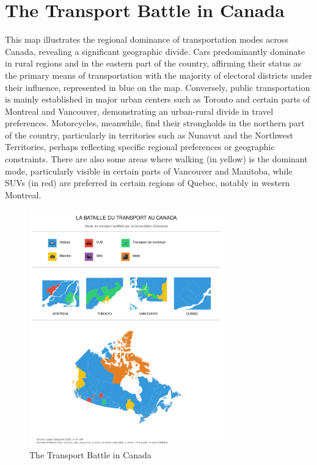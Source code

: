\documentclass[
  letterpaper,
  DIV=11,
  numbers=noendperiod]{scrartcl}
\begin{document}
\section{The Transport Battle in
Canada}\label{the-transport-battle-in-canada}

This map illustrates the regional dominance of transportation modes
across Canada, revealing a significant geographic divide. Cars
predominantly dominate in rural regions and in the eastern part of the
country, affirming their status as the primary means of transportation
with the majority of electoral districts under their influence,
represented in blue on the map. Conversely, public transportation is
mainly established in major urban centers such as Toronto and certain
parts of Montreal and Vancouver, demonstrating an urban-rural divide in
travel preferences. Motorcycles, meanwhile, find their strongholds in
the northern part of the country, particularly in territories such as
Nunavut and the Northwest Territories, perhaps reflecting specific
regional preferences or geographic constraints. There are also some
areas where walking (in yellow) is the dominant mode, particularly
visible in certain parts of Vancouver and Manitoba, while SUVs (in red)
are preferred in certain regions of Quebec, notably in western Montreal.

\begin{figure}[H]

{\centering \includegraphics[width=0.75\textwidth,height=\textheight]{img/transport_map.png}

}

\caption{The Transport Battle in Canada}

\end{figure}%
\end{document}
